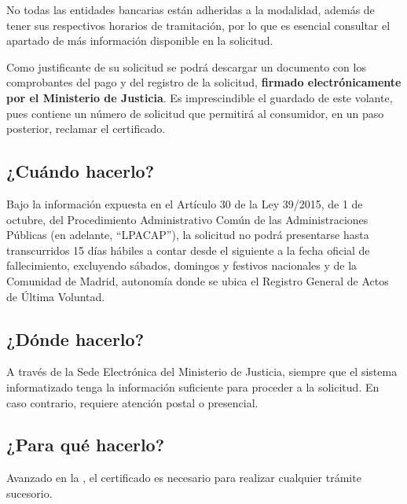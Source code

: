No todas las entidades bancarias están adheridas a la modalidad, además de tener sus respectivos horarios de tramitación, por lo que es esencial consultar el apartado de más información disponible en la solicitud.

Como justificante de su solicitud se podrá descargar un documento con los comprobantes del pago y del registro de la solicitud, \textbf{firmado electrónicamente por el Ministerio de Justicia}. Es imprescindible el guardado de este volante, pues contiene un número de solicitud que permitirá al consumidor, en un paso posterior, reclamar el certificado.

\subsection{¿Cuándo hacerlo?}
Bajo la información expuesta en el Artículo 30 de la Ley 39/2015, de 1 de octubre, del Procedimiento Administrativo Común de las Administraciones Públicas \cite{LPACAP} (en adelante, ``LPACAP''), la solicitud no podrá presentarse hasta transcurridos 15 días hábiles a contar desde el siguiente a la fecha oficial de fallecimiento, excluyendo sábados, domingos y festivos nacionales y de la Comunidad de Madrid, autonomía donde se ubica el Registro General de Actos de Última Voluntad.

\subsection{¿Dónde hacerlo?}
A través de la Sede Electrónica del Ministerio de Justicia, siempre que el sistema informatizado tenga la información suficiente para proceder a la solicitud. En caso contrario, requiere atención postal o presencial.

\subsection{¿Para qué hacerlo?}
Avanzado en la , el certificado es necesario para realizar cualquier trámite sucesorio.
